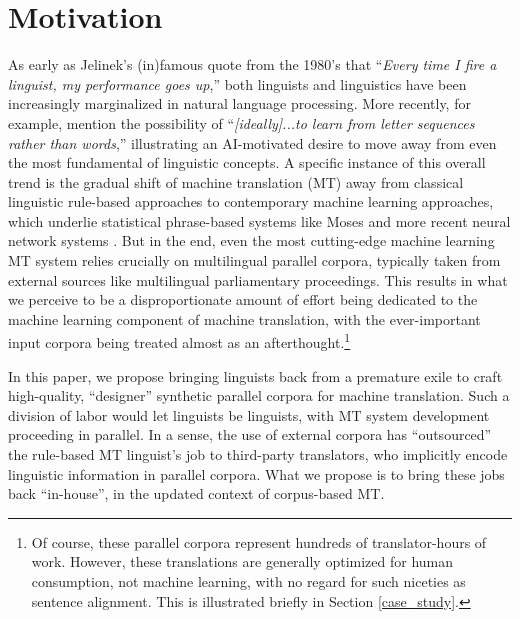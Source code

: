 \section{Motivation} 

As early as Jelinek's (in)famous quote from the 1980's that ``{\em Every time I fire a linguist, my performance goes up},'' both linguists and linguistics have been increasingly marginalized in natural language processing. 
More recently, for example,  mention the possibility of ``{\em [ideally]...to learn from letter sequences rather than words},'' illustrating an AI-motivated desire to move away from even the most fundamental of linguistic concepts.
A specific instance of this overall trend is the gradual shift of machine translation (MT) away from classical linguistic rule-based approaches  to contemporary machine learning approaches, which underlie statistical phrase-based systems like Moses  and more recent neural network systems .  
But in the end, even the most cutting-edge machine learning MT system relies crucially on multilingual parallel corpora, typically taken from external sources like multilingual parliamentary proceedings. 
This results in what we perceive to be a disproportionate amount of effort being dedicated to the machine learning component of machine translation, with the ever-important input corpora being treated almost as an afterthought.\footnote{
    Of course, these parallel corpora represent hundreds of translator-hours of work. 
    However, these translations are generally optimized for human consumption, not machine learning, with no regard for such niceties as sentence alignment.
    This is illustrated briefly in Section \ref{case_study}.
    }


In this paper, we propose bringing linguists back from a premature exile to craft high-quality, ``designer'' synthetic parallel corpora for machine translation.
Such a division of labor would let linguists be linguists, with MT system development proceeding in parallel.  
In a sense, the use of external corpora has ``outsourced'' the rule-based MT linguist's job to third-party translators, who implicitly encode linguistic information in parallel corpora.  
What we propose is to bring these jobs back ``in-house'', in the updated context of corpus-based MT.



